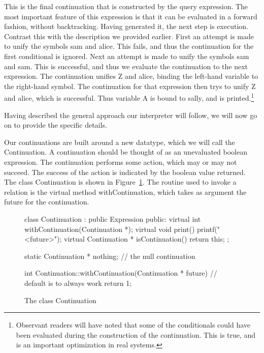 This is the final continuation that is constructed by the query expression.
The most important feature of this expression is that it can be evaluated
in a forward fashion, without backtracking.
Having generated it, the next step is execution.  Contrast this with the
description we provided earlier.  First an attempt is made to unify the
symbols {\sf sam} and {\sf alice}.  This fails, and thus the continuation 
for the first conditional is ignored.  Next an attempt is made to unify 
the symbols {\sf sam} and {\sf sam}.  This is successful, and thus we 
evaluate the continuation to the next expression.  The continuation unifies 
{\sf Z} and {\sf alice}, binding the left-hand variable to the right-hand 
symbol.  The continuation for that expression then trys to unify {\sf Z} and 
{\sf alice}, which is successful.  Thus variable {\sf A} is bound to 
{\sf sally}, and is printed.\footnote{Observant readers will have noted
that some of the conditionals could have been evaluated during the
construction of the continuation.  This is true, and is an important
optimization in real systems.}

Having described the general approach our interpreter will follow, we will
now go on to provide the specific details.

Our continuations are built around a new datatype, which we will call the
{\sf Continuation}.
A continuation should be thought of as an unevaluated boolean expression.
The continuation performs some action, which may
or may not succeed.   The success of the action is indicated by the boolean
value returned.  
The class Continuation is shown in Figure~\ref{relation}.  The routine used to
invoke a relation is the virtual method {\sf withContinuation}, which takes
as argument the future for the continuation.

\begin{figure}
\begin{cprog}
class Continuation : public Expression {
public:
	virtual int withContinuation(Continuation *);
	virtual void print() { printf("<future>"); }
	virtual Continuation * isContinuation() { return this; }
};

static Continuation * nothing;	// the null continuation

int Continuation::withContinuation(Continuation * future)
{
	// default is to always work
	return 1;
}
\end{cprog}
\caption{The class {\sf Continuation}}\label{relation}
\end{figure}

